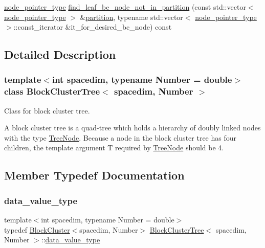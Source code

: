 \begin{DoxyCompactItemize}
\item 
\hyperlink{classTreeNode}{node\+\_\+pointer\+\_\+type} \hyperlink{classBlockClusterTree_a4782e1e817b6e6265bff43baf2b1dbaa}{find\+\_\+leaf\+\_\+bc\+\_\+node\+\_\+not\+\_\+in\+\_\+partition} (const std\+::vector$<$ \hyperlink{classTreeNode}{node\+\_\+pointer\+\_\+type} $>$ \&\hyperlink{classBlockClusterTree_a3ca42421f732c20fc07bdf5d5ab94319}{partition}, typename std\+::vector$<$ \hyperlink{classTreeNode}{node\+\_\+pointer\+\_\+type} $>$\+::const\+\_\+iterator \&it\+\_\+for\+\_\+desired\+\_\+bc\+\_\+node) const
\end{DoxyCompactItemize}


\subsection{Detailed Description}
\subsubsection*{template$<$int spacedim, typename Number = double$>$\newline
class Block\+Cluster\+Tree$<$ spacedim, Number $>$}

Class for block cluster tree. 

A block cluster tree is a quad-\/tree which holds a hierarchy of doubly linked nodes with the type \hyperlink{classTreeNode}{Tree\+Node}. Because a node in the block cluster tree has four children, the template argument {\ttfamily T} required by {\ttfamily \hyperlink{classTreeNode}{Tree\+Node}} should be 4. 

\subsection{Member Typedef Documentation}
\mbox{\label{classBlockClusterTree_a4d03fe184a7f7838111b27cdae056a62}} 
\subsubsection{\texorpdfstring{data\+\_\+value\+\_\+type}{data\_value\_type}}
{\footnotesize\ttfamily template$<$int spacedim, typename Number = double$>$ \\
typedef \hyperlink{classBlockCluster}{Block\+Cluster}$<$spacedim, Number$>$ \hyperlink{classBlockClusterTree}{Block\+Cluster\+Tree}$<$ spacedim, Number $>$\+::\hyperlink{classBlockClusterTree_a4d03fe184a7f7838111b27cdae056a62}{data\+\_\+value\+\_\+type}}

